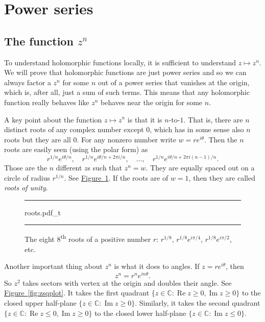 \documentclass[12pt,openany]{book}
\renewcommand{\Re}{\operatorname{Re}}
\renewcommand{\Im}{\operatorname{Im}}
\newcommand{\C}{{\mathbb{C}}}
\newcommand{\myindex}[1]{#1\index{#1}}
\theoremstyle{plain}
\theoremstyle{remark}
\theoremstyle{definition}
\newenvironment{myfig}{%
\begin{figure}[h!t]
\noindent\rule{\textwidth}{0.4pt}\vspace{12pt}\par\centering}%
{\par\noindent\rule{\textwidth}{0.4pt}
\end{figure}}
\theoremstyle{exercise}
\theoremstyle{example}
\newcommand{\figureref}[1]{\hyperref[#1]{Figure~\ref*{#1}}}
\begin{document}
\section{Power series}
\label{sec:powerser}

\subsection{The function \texorpdfstring{$z^n$}{z to the n}}

To understand holomorphic functions locally, 
it is sufficient to understand $z \mapsto z^n$.  We will prove that
holomorphic functions are just power series and so we can always factor
a $z^n$ for some $n$ out of a power series that vanishes at the origin,
which is, after all, just a sum of such terms.  This means that any holomorphic
function really behaves like $z^n$ behaves near the origin for some $n$.

A key point about the function $z \mapsto z^n$ is that it is $n$-to-$1$.
That is, there are $n$ distinct roots of any complex number except $0$,
which has in some sense also $n$ roots but they are all $0$.  For any nonzero
number write $w = re^{i\theta}$.  Then the $n$ roots are easily seen
(using the polar form) as
\begin{equation*}
r^{1/n} e^{i\theta/n}
, \quad
r^{1/n} e^{i\theta/n + 2\pi i /n}
, \quad \ldots, \quad
r^{1/n} e^{i\theta/n + 2\pi i (n-1)/n} .
\end{equation*}
Those are the $n$ different $z$s such that $z^n=w$.  They are equally
spaced out on a circle of radius $r^{1/n}$.  See
\figureref{fig:roots}.  If the roots are of $w=1$, then they are
called \emph{\myindex{roots of unity}}.

\begin{myfig}
{roots.pdf_t}
\caption{The eight $8$\textsuperscript{th} roots of a positive number $r$:
$r^{1/8}$, $r^{1/8} e^{i \pi / 4}$,  $r^{1/8} e^{i \pi / 2}$,
etc.\label{fig:roots}}
\end{myfig}

Another important thing about $z^n$ is what it does to angles.
If $z = re^{i\theta}$, then
\begin{equation*}
z^n = r^n e^{i n\theta} .
\end{equation*}
So $z^2$ takes sectors with vertex at the origin and doubles their angle.
See \figureref{fig:zsqplot}.
It takes the first quadrant
$\{ z \in \C : \Re z \geq 0, \Im z \geq 0 \}$
to the closed upper half-plane $\{ z \in \C : \Im z \geq 0 \}$.
Similarly, it takes the second quadrant
$\{ z \in \C : \Re z \leq 0, \Im z \geq 0 \}$
to the closed lower half-plane $\{ z \in \C : \Im z \leq 0 \}$.
\end{document}

